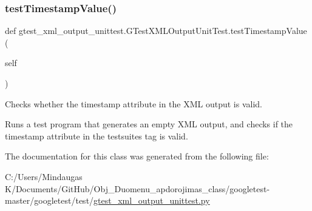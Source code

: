 \subsubsection{\texorpdfstring{testTimestampValue()}{testTimestampValue()}}
{\footnotesize\ttfamily def gtest\+\_\+xml\+\_\+output\+\_\+unittest.\+G\+Test\+X\+M\+L\+Output\+Unit\+Test.\+test\+Timestamp\+Value (\begin{DoxyParamCaption}\item[{}]{self }\end{DoxyParamCaption})}

\begin{DoxyVerb}Checks whether the timestamp attribute in the XML output is valid.

Runs a test program that generates an empty XML output, and checks if
the timestamp attribute in the testsuites tag is valid.
\end{DoxyVerb}
 

The documentation for this class was generated from the following file\+:\begin{DoxyCompactItemize}
\item 
C\+:/\+Users/\+Mindaugas K/\+Documents/\+Git\+Hub/\+Obj\+\_\+\+Duomenu\+\_\+apdorojimas\+\_\+class/googletest-\/master/googletest/test/\mbox{\hyperlink{googletest-master_2googletest_2test_2gtest__xml__output__unittest_8py}{gtest\+\_\+xml\+\_\+output\+\_\+unittest.\+py}}\end{DoxyCompactItemize}
